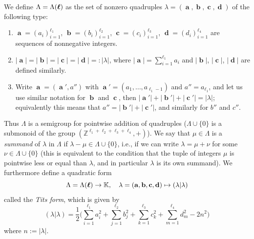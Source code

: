 \documentclass[12pt,reqno]{amsart}
\begin{document}
We define $ \Lambda=\Lambda(\boldsymbol{\ell}) $
as the set of nonzero quadruples
$\lambda=(\mbfa,\mbfb,\mbfc,\mbfd)$
of the following type:
%
\begin{enumerate}[label=($\Lambda$.\arabic*)]
\item \label{Lambda.property:item:1}
$\mbfa = (a_i)_{i=1}^{\ell_1}$, $\mbfb = (b_i)_{i=1}^{\ell_2}$,
$\mbfc = (c_i)_{i=1}^{\ell_3}$,
$\mbfd = (d_i)_{i=1}^{\ell_4}$ are
sequences of nonnegative integers.

\item \label{Lambda.property:item:2}
$|\mbfa|=|\mbfb|=|\mbfc|=|\mbfd|=:|\lambda|$, where $|\mbfa|=\sum_{i=1}^{\ell_1} a_i$
and $|\mbfb|$, $|\mbfc|$, $|\mbfd|$ are defined similarly.

\item \label{Lambda.property:item:3}
Write $\mbfa=(\mbfa',a'')$
with $\mbfa'=(a_1,\ldots,a_{\ell_1-1})$ and $a''=a_{\ell_1}$, and let us use similar notation for $\mbfb$ and $\mbfc$,
then
$|\mbfa'|+|\mbfb'|+|\mbfc'|=|\lambda|$;
equivalently this means that
$a''=|\mbfb'|+|\mbfc'|$, and similarly for $b''$ and $c''$.
\end{enumerate}
Thus $\Lambda$ is a semigroup for pointwise addition of quadruples
($\Lambda\cup\{0\}$ is a submonoid of the group $(\mathbb{Z}^{\ell_1+\ell_2+\ell_3+\ell_4},+)$).
%
%
We say that $\mu\in\Lambda$ is a \emph{summand} of $\lambda$ in $\Lambda$ if %
$\lambda-\mu\in\Lambda\cup\{0\}$, i.e., if we can write
$\lambda=\mu+\nu$ for some $\nu\in \Lambda\cup\{0\}$
(this is equivalent to the condition that
the tuple of integers $\mu$ is pointwise less or equal than $\lambda$, and in particular $\lambda$ is its own summand).
%
We furthermore define a quadratic form
$$
\Lambda=\Lambda(\boldsymbol{\ell})\to\mathbb{K},\quad \lambda=(\mathbf{a},\mathbf{b},\mathbf{c},\mathbf{d})\mapsto(\lambda|\lambda)
$$
called the \emph{Tits form},
which is given by %
%
\begin{equation} \label{eq:general.Tits.form}
(\lambda|\lambda) = \frac{1}{2}\Big(\sum_{i = 1}^{\ell_1} a_i^2+
\sum_{j = 1}^{\ell_2} b_j^2+\sum_{k = 1}^{\ell_3} c_k^2+\sum_{m = 1}^{\ell_4} d_m^2-2n^2\Big)
\end{equation}
%
where $n:=|\lambda|$.
\end{document}
